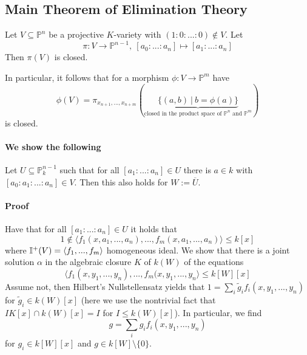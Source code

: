 
\subsection{Main Theorem of Elimination Theory}
Let $V \subseteq \mathbb{P}^n$ be a projective $K$-variety with $(1 : 0 : ... : 0) \notin V$.
Let
\begin{equation*}
    \pi: V \to \mathbb{P}^{n - 1}, \ [a_0 : ... : a_n] \mapsto [a_1 : ... : a_n]
\end{equation*}
Then $\pi(V)$ is closed.

In particular, it follows that for a morphism $\phi: V \to \mathbb{P}^m$ have \
\begin{equation*}
    \phi(V) = \pi_{x_{n + 1}, ..., x_{n + m}}(\underbrace{\{ (a, b) \ | \ b = \phi(a) \}}_{\text{closed in the product space of $\mathbb{P}^n$ and $\mathbb{P}^m$}})
\end{equation*}
is closed.

\paragraph{We show the following}
Let $U \subseteq \mathbb{P}^{n - 1}_k$ such that for all $[a_1 : ... : a_n] \in U$ there is $a \in k$ with $[a_0 : a_1 : ... : a_n] \in V$.
Then this also holds for $W := \overline{U}$.
\paragraph{Proof} 
Have that for all $[a_1 : ... : a_n] \in U$ it holds that
\begin{equation*}
    1 \notin \langle f_1(x, a_1, ..., a_n), ..., f_m(x, a_1, ..., a_n) \rangle \leq k[x]
\end{equation*}
where $\mathbb{I}^+(V) = \langle f_1, ..., f_m \rangle$ homogeneous ideal. 
We show that there is a joint solution $\alpha$ in the algebraic closure $K$ of $k(W)$ of the equations
\begin{equation*}
    \langle f_1(x, y_1, ..., y_n), ..., f_m(x, y_1, ..., y_n \rangle \leq k[W][x]
\end{equation*}
Assume not, then Hilbert's Nullstellensatz yields that $1 = \sum_i \tilde{g}_i f_i(x, y_1, ..., y_n)$ for $\tilde{g}_i \in k(W)[x]$
(here we use the nontrivial fact that $IK[x] \cap k(W)[x] = I$ for $I \leq k(W)[x]$).
In particular, we find
\begin{equation*}
    g = \sum_i g_i f_i(x, y_1, ..., y_n)
\end{equation*}
for $g_i \in k[W][x]$ and $g \in k[W] \setminus \{0\}$.

